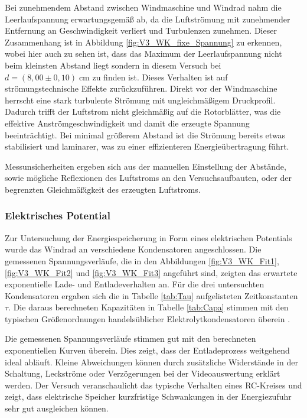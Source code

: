 \documentclass{article}
\begin{document}
\noindent Bei zunehmendem Abstand zwischen Windmaschine und Windrad nahm die Leerlaufspannung erwartungsgemäß ab, da die Luftströmung mit zunehmender Entfernung an Geschwindigkeit verliert und Turbulenzen zunehmen. Dieser Zusammenhang ist in Abbildung \ref{fig:V3_WK_fixe_Spannung} zu erkennen, wobei hier auch zu sehen ist, dass das Maximum der Leerlaufspannung nicht beim kleinsten Abstand liegt sondern in diesem Versuch bei $d=(8{,}00 \pm 0{,}10) \; \text{cm}$ zu finden ist. Dieses Verhalten ist auf strömungstechnische Effekte zurückzuführen. Direkt vor der Windmaschine herrscht eine stark turbulente Strömung mit ungleichmäßigem Druckprofil. Dadurch trifft der Luftstrom nicht gleichmäßig auf die Rotorblätter, was die effektive Anströmgeschwindigkeit und damit die erzeugte Spannung beeinträchtigt. Bei minimal größerem Abstand ist die Strömung bereits etwas stabilisiert und laminarer, was zu einer effizienteren Energieübertragung führt.

\noindent Messunsicherheiten ergeben sich aus der manuellen Einstellung der Abstände, sowie mögliche Reflexionen des Luftstroms an den Versuchsaufbauten, oder der begrenzten Gleichmäßigkeit des erzeugten Luftstroms.

\subsubsection{Elektrisches Potential}
\noindent Zur Untersuchung der Energiespeicherung in Form eines elektrischen Potentials wurde das Windrad an verschiedene Kondensatoren angeschlossen. Die gemessenen Spannungsverläufe, die in den Abbildungen \ref{fig:V3_WK_Fit1}, \ref{fig:V3_WK_Fit2} und \ref{fig:V3_WK_Fit3} angeführt sind, zeigten das erwartete exponentielle Lade- und Entladeverhalten an. Für die drei untersuchten Kondensatoren ergaben sich die in Tabelle \ref{tab:Tau} aufgelisteten Zeitkonstanten $\tau$. Die daraus berechneten Kapazitäten in Tabelle \ref{tab:Capa} stimmen mit den typischen Größenordnungen handelsüblicher Elektrolytkondensatoren überein \cite{tiplermosca}.

\vspace{2mm}

\noindent Die gemessenen Spannungsverläufe stimmen gut mit den berechneten exponentiellen Kurven überein. Dies zeigt, dass der Entladeprozess weitgehend ideal abläuft. Kleine Abweichungen können durch zusätzliche Widerstände in der Schaltung, Leckströme oder Verzögerungen bei der Videoauswertung erklärt werden. Der Versuch veranschaulicht das typische Verhalten eines RC-Kreises und zeigt, dass elektrische Speicher kurzfristige Schwankungen in der Energiezufuhr sehr gut ausgleichen können.
\end{document}
